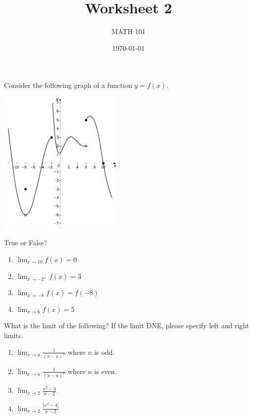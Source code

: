 \documentclass[12pt]{amsart}
\title{ Worksheet 2 }
\author{MATH 101}
\date{\today}
\begin{document}
\maketitle

\begin{question}
	Consider the following graph of a function $y = f(x)$.
	\begin{center}
		\includegraphics[width=0.45\textwidth]{figures/1.jpeg}
	\end{center}
	True or False?
	\begin{enumerate}
		\item $\displaystyle \lim_{x\to 10} f(x)=0$
		\item $\displaystyle \lim_{x \to -2^+} f(x) = 3$
		\item $\displaystyle \lim_{x \to -8} f(x) = f(-8)$
		\item $\displaystyle \lim_{x \to 6} f(x) = 5 $
	\end{enumerate}

\end{question}


\begin{question}
	What is the limit of the following?
	If the limit DNE, please specify left and right limits.
	\begin{enumerate}
		\item $\lim_{x\to a} \frac{1}{(x -a)^n}$ where $n$ is odd.
		      \vspace{5cm}
		\item $\lim_{x\to a} \frac{1}{(x -a)^n}$ where $n$ is even.
		      \vspace{5cm}
		\item $\lim_{x \to 2} \frac{x^2 - 4}{x-2}$
		      \vspace{5cm}
		\item $\lim_{x \to 2} \frac{|x^2 - 4|}{x-2}$
		      \vspace{5cm}
	\end{enumerate}
\end{question}
\end{document}

